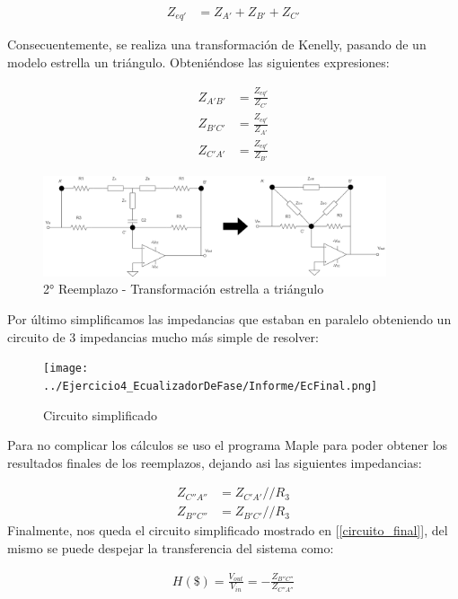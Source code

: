 \begin{align*}
	Z_{eq'} &= Z_{A'} + Z_{B'} + Z_{C'}
\end{align*}

Consecuentemente, se realiza una transformación de Kenelly, pasando 
de un modelo estrella un triángulo. Obteniéndose las siguientes expresiones:

\begin{align}
	Z_{A'B'} &= \frac{Z_{eq'}}{Z_{C'}} \\
	Z_{B'C'} &= \frac{Z_{eq'}}{Z_{A'}}  \\
	Z_{C'A'} &= \frac{Z_{eq'}}{Z_{B'}} 
\end{align}



\begin{figure}[H]
	\centering
	\includegraphics[width=0.9\textwidth]{../Ejercicio4-EcualizadorDeFase/Informe/2cambioTriangulo.png}
	\caption{2° Reemplazo - Transformación estrella a triángulo}
	\label{2reemplazo} 
\end{figure}

Por último simplificamos las impedancias que estaban en paralelo obteniendo un circuito de 3 impedancias mucho más simple de resolver:

\begin{figure}
	\centering
	\texttt{[image: ../Ejercicio4\_EcualizadorDeFase/Informe/EcFinal.png]}
	\caption{Circuito simplificado}
	\label{Cir Final}
\end{figure}

Para no complicar los cálculos se uso el programa Maple
 para poder obtener los resultados finales de los reemplazos, 
 dejando asi las siguientes impedancias:

\begin{align}
		Z_{C''A''} & = Z_{C'A'}//R_3 \\
		Z_{B''C''} & = Z_{B'C'}//R_3
\end{align}
Finalmente, nos queda el circuito simplificado mostrado en 
[\ref{circuito_final}], del mismo se puede despejar la transferencia 
del sistema como:

\begin{align}
	H(\$)=\frac{V_{out}}{V_{in}}=-\frac{Z_{B''C''}}{Z_{C''A''}}
	\label{trans}
\end{align}

